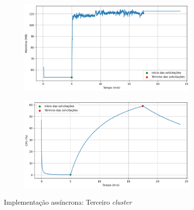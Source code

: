 \documentclass[12pt]{article}
\begin{document}
\begin{figure}[H]
	\centering
	\begin{subfigure}[H]{0.45\textwidth}
			\centering
			\label{fig:async-cluster_usage_2a}
			\includegraphics[width=1\textwidth]{images/pt-br/results/async-cluster_memory_usage_2.png}
	\end{subfigure}
	\hfill%
	\begin{subfigure}[H]{0.45\textwidth}
			\centering
			\label{fig:async-cluster_usage_2b}
			\includegraphics[width=1\textwidth]{images/pt-br/results/async-cluster_cpu_usage_2.png}
	\end{subfigure}
	
	\caption{Implementação assíncrona: Terceiro \textit{cluster}}\label{fig:async-cluster_usage_2}
\end{figure}
\end{document}
